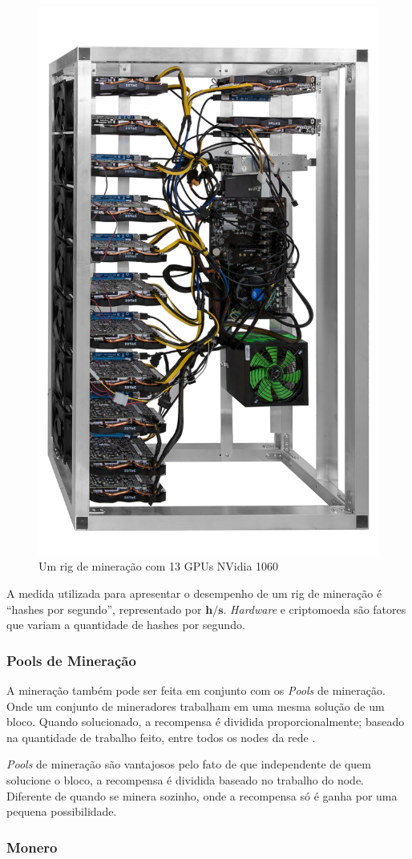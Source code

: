 \documentclass[
article,			%
12pt,				%
openright,			%
oneside,			%
a4paper,			%
chapter=TITLE,		%
section=TITLE,		%
subsection=TITLE,	%
subsubsection=TITLE,%
subsubsubsection=TITLE, %
english,			%
brazil,				%
]{abntex2}
\begin{document}
\begin{figure}[H]
    \caption{\label{fig:rig_mineracao}Um rig de mineração com 13 GPUs
    NVidia 1060}
    \begin{center}
        \includegraphics[width=.3\linewidth]{rig_mineracao.png}
    \end{center}
\end{figure}

A medida utilizada para apresentar o desempenho de um rig de mineração
é ``hashes por segundo'', representado por $\mathbf{h/s}$.
\emph{Hardware} e criptomoeda são fatores que variam a quantidade de
hashes por segundo.

\subsubsection{Pools de Mineração}

A mineração também pode ser feita em conjunto com os \emph{Pools} de
mineração. Onde um conjunto de mineradores trabalham em uma mesma
solução de um bloco. Quando solucionado, a recompensa é dividida
proporcionalmente; baseado na quantidade de trabalho feito, entre
todos os nodes da rede \cite{Weber2012}.

\emph{Pools} de mineração são vantajosos pelo fato de que independente
de quem solucione o bloco, a recompensa é dividida baseado no trabalho
do node. Diferente de quando se minera sozinho, onde a recompensa só é
ganha por uma pequena possibilidade.

\subsubsection{Monero}
\end{document}
